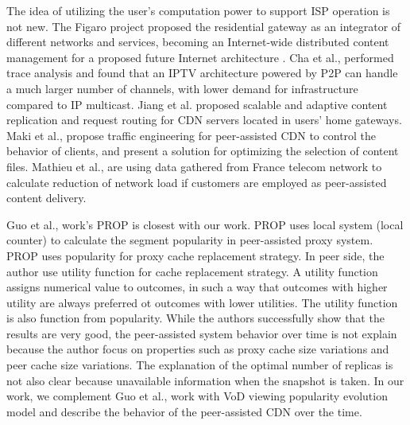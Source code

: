 \documentclass[10pt,final,journal,a4paper]{IEEEtran}
\begin{document}
The idea of utilizing the user's computation power to support ISP operation is not new.  
The Figaro project \cite{figaro} proposed the residential gateway as an integrator of different networks and services, becoming an Internet-wide distributed content management for a proposed future Internet architecture \cite{figaro}.  
Cha et al.,\cite{Cha:2008:NTP:1855641.1855646} performed trace analysis and found that an IPTV architecture powered by P2P can handle a much larger number of channels, with lower demand for infrastructure compared to IP multicast.  
Jiang et al. \cite{Jiang:2012:OMD:2413176.2413193} proposed scalable and adaptive content replication and request routing for CDN servers located in users' home gateways.  
Maki et al.,\cite{NaoyaMAKI2012} propose traffic engineering for peer-assisted CDN to control the behavior of clients, and present a solution for optimizing the selection of content files.
Mathieu et al., \cite{6249305} are using data gathered from France telecom network to calculate reduction of network load if customers are employed as peer-assisted content delivery.

Guo et al., \cite{1613869} work's PROP is closest with our work.
PROP uses local system (local counter) to calculate the segment popularity in peer-assisted proxy system. 
PROP uses popularity for proxy cache replacement strategy. 
In peer side, the author use utility function for cache replacement strategy.
A utility function assigns numerical value to outcomes, in such a way that outcomes with higher utility are always preferred ot outcomes with lower utilities.
The utility function is also function from popularity.
While the authors successfully show that the results are very good, the peer-assisted system behavior over time is not explain because the author focus on properties such as proxy cache size variations and peer cache size variations.
The explanation of the optimal number of replicas is not also clear because unavailable information when the snapshot is taken.  
In our work, we complement Guo et al., \cite{1613869} work with VoD viewing popularity evolution model and describe the behavior of the peer-assisted CDN over the time.
\end{document}
